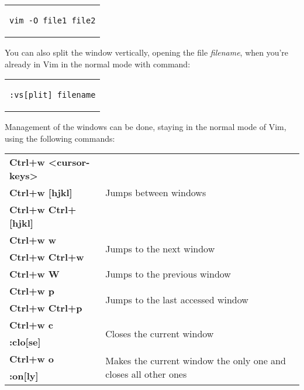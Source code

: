 \begin{itemize}
{\begin{center}
\begin{tabular}{c}
\begin{lstlisting}[linewidth=100pt, basicstyle=\footnotesize\sffamily,]
vim -O file1 file2
\end{lstlisting}
\end{tabular}
\end{center}
You can also split the window vertically, opening the file \textit{filename}, when you're already in Vim in the normal mode with command:\\
\begin{center}
\begin{tabular}{c}
\begin{lstlisting}[linewidth=100pt, basicstyle=\footnotesize\sffamily,]
:vs[plit] filename
\end{lstlisting}
\end{tabular}
\end{center}
Management of the windows can be done, staying in the normal mode of Vim, using the following commands:\\
\begin{table}[h]
\centering
\footnotesize
\begin{tabular}{|l|l|}
\hline
\textbf{Ctrl+w  <cursor-keys>} & \multirow{3}{*}{Jumps between windows}\\
\cline{1-1}
\textbf{Ctrl+w  [hjkl]} & {}\\
\cline{1-1}
\textbf{Ctrl+w  Ctrl+[hjkl]} & {}\\
\hline
\textbf{Ctrl+w  w} & \multirow{2}{*}{Jumps to the next window}\\
\cline{1-1}
\textbf{Ctrl+w  Ctrl+w} & {}\\
\hline
\textbf{Ctrl+w  W} & {Jumps to the previous window}\\
\hline
\textbf{Ctrl+w  p} & \multirow{2}{*}{Jumps to the last accessed window}\\
\cline{1-1}
\textbf{Ctrl+w  Ctrl+p} & {}\\
\hline
\textbf{Ctrl+w  c} & \multirow{2}{*}{Closes the current window}\\
\cline{1-1}
\textbf{:clo[se]} & {}\\
\hline
\textbf{Ctrl+w  o} & \multirow{2}{*}{Makes the current window the only one and closes all other ones}\\
\cline{1-1}
\textbf{:on[ly]} & {}\\
\hline
\end{tabular}
\end{table}
}
\end{itemize}